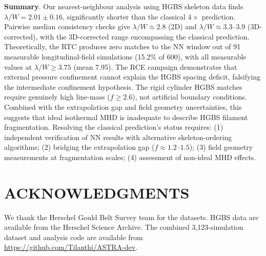 \documentclass[twocolumn,usenatbib]{mnras}
\begin{document}
\textbf{Summary}. Our nearest-neighbour analysis using HGBS skeleton data finds $\lambda/W = 2.01 \pm 0.16$, significantly shorter than the classical $4\times$ prediction. Pairwise median consistency checks give $\lambda/W \approx 2.8$ (2D) and $\lambda/W \approx 3.3$--$3.9$ (3D-corrected), with the 3D-corrected range encompassing the classical prediction. Theoretically, the RTC produces zero matches to the NN window out of 91 measurable longitudinal-field simulations (15.2\% of 600), with all measurable values at $\lambda/W \geq 3.75$ (mean 7.95). The RCE campaign demonstrates that external pressure confinement cannot explain the HGBS spacing deficit, falsifying the intermediate confinement hypothesis. The rigid cylinder HGBS matches require genuinely high line-mass ($f \geq 2.6$), not artificial boundary conditions. Combined with the extrapolation gap and field geometry uncertainties, this suggests that ideal isothermal MHD is inadequate to describe HGBS filament fragmentation. Resolving the classical prediction's status requires: (1) independent verification of NN results with alternative skeleton-ordering algorithms; (2) bridging the extrapolation gap ($f \approx 1.2$--$1.5$); (3) field geometry measurements at fragmentation scales; (4) assessment of non-ideal MHD effects.

\section*{ACKNOWLEDGMENTS}

We thank the Herschel Gould Belt Survey team for the datasets. HGBS data are available from the Herschel Science Archive. The combined 3,123-simulation dataset and analysis code are available from \url{https://github.com/Tilanthi/ASTRA-dev}.



\end{document}
